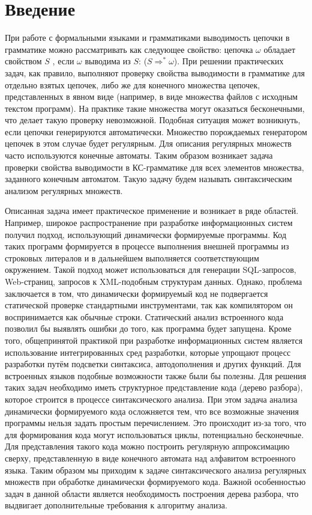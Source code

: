 \section*{Введение}
При работе с формальными языками и грамматиками выводимость цепочки в грамматике можно рассматривать как следующее свойство: цепочка $\omega$ обладает свойством $S$ , если $\omega$ выводима из $S$: ($S \Rightarrow^* \omega $). При решении практических задач, как правило, выполняют проверку свойства выводимости в грамматике для отдельно взятых цепочек, либо же для конечного множества цепочек, представленных в явном виде (например, в виде множества файлов с исходным текстом программ). На практике такие множества могут оказаться бесконечными, что делает такую проверку невозможной. Подобная ситуация может возникнуть, если цепочки генерируются автоматически. Множество порождаемых генератором цепочек в этом случае будет регулярным. Для описания регулярных множеств часто используются конечные автоматы. Таким образом возникает задача проверки свойства выводимости в КС-грамматике для всех элементов множества, заданного конечным автоматом. Такую задачу будем называть синтаксическим анализом регулярных множеств. 
	
Описанная задача имеет практическое применение и возникает в ряде областей. Например, широкое распространение при разработке информационных систем получил подход, использующий динамически формируемые программы. Код таких программ формируется в процессе выполнения внешней программы из строковых литералов и в дальнейшем выполняется соответствующим окружением. Такой подход может использоваться для генерации SQL-запросов, Web-страниц, запросов к XML-подобным структурам данных. Однако, проблема заключается в том, что динамически формируемый код не подвергается статической проверке стандартными инструментами, так как компилятором он воспринимается как обычные строки. Статический анализ встроенного кода позволил бы выявлять ошибки до того, как программа будет запущена. Кроме того, общепринятой практикой при разработке информационных систем является использование интегрированных сред разработки, которые упрощают процесс разработки путём подсветки синтаксиса, автодополнения и других функций. Для встроенных языков подобные возможности также были бы полезны. Для решения таких задач необходимо иметь структурное представление кода (дерево разбора), которое строится в процессе синтаксического анализа. При этом задача анализа динамически формируемого кода осложняется тем, что все возможные значения программы нельзя задать простым перечислением. Это происходит из-за того, что для формирования кода могут использоваться циклы, потенциально бесконечные. Для представления такого кода можно построить регулярную аппроксимацию сверху, представленную в виде конечного автомата над алфавитом встроенного языка. Таким образом мы приходим к задаче синтаксического анализа регулярных множеств при обработке динамически формируемого кода. Важной особенностью задач в данной области является необходимость построения дерева разбора, что выдвигает дополнительные требования к алгоритму анализа.

